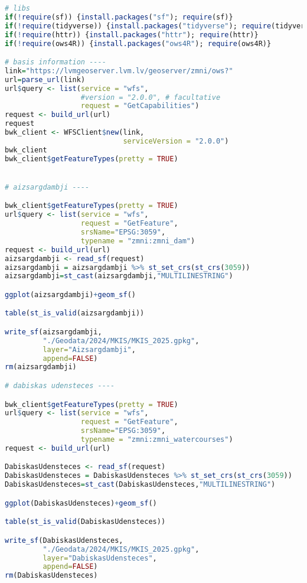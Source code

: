 \documentclass[
]{book}
\begin{document}
\begin{lstlisting}[language=R]
# libs
if(!require(sf)) {install.packages("sf"); require(sf)}
if(!require(tidyverse)) {install.packages("tidyverse"); require(tidyverse)}
if(!require(httr)) {install.packages("httr"); require(httr)}
if(!require(ows4R)) {install.packages("ows4R"); require(ows4R)}

# basis information ----
link="https://lvmgeoserver.lvm.lv/geoserver/zmni/ows?"
url=parse_url(link)
url$query <- list(service = "wfs",
                  #version = "2.0.0", # facultative
                  request = "GetCapabilities")
request <- build_url(url)
request
bwk_client <- WFSClient$new(link, 
                            serviceVersion = "2.0.0")
bwk_client
bwk_client$getFeatureTypes(pretty = TRUE)


# aizsargdambji ----

bwk_client$getFeatureTypes(pretty = TRUE)
url$query <- list(service = "wfs",
                  request = "GetFeature",
                  srsName="EPSG:3059",
                  typename = "zmni:zmni_dam")
request <- build_url(url)
aizsargdambji <- read_sf(request)
aizsargdambji = aizsargdambji %>% st_set_crs(st_crs(3059))
aizsargdambji=st_cast(aizsargdambji,"MULTILINESTRING")

ggplot(aizsargdambji)+geom_sf()

table(st_is_valid(aizsargdambji))

write_sf(aizsargdambji,
         "./Geodata/2024/MKIS/MKIS_2025.gpkg",
         layer="Aizsargdambji",
         append=FALSE)
rm(aizsargdambji)

# dabiskas udensteces ----

bwk_client$getFeatureTypes(pretty = TRUE)
url$query <- list(service = "wfs",
                  request = "GetFeature",
                  srsName="EPSG:3059",
                  typename = "zmni:zmni_watercourses")
request <- build_url(url)

DabiskasUdensteces <- read_sf(request)
DabiskasUdensteces = DabiskasUdensteces %>% st_set_crs(st_crs(3059))
DabiskasUdensteces=st_cast(DabiskasUdensteces,"MULTILINESTRING")

ggplot(DabiskasUdensteces)+geom_sf()

table(st_is_valid(DabiskasUdensteces))

write_sf(DabiskasUdensteces,
         "./Geodata/2024/MKIS/MKIS_2025.gpkg",
         layer="DabiskasUdensteces",
         append=FALSE)
rm(DabiskasUdensteces)




\end{lstlisting}
\end{document}
